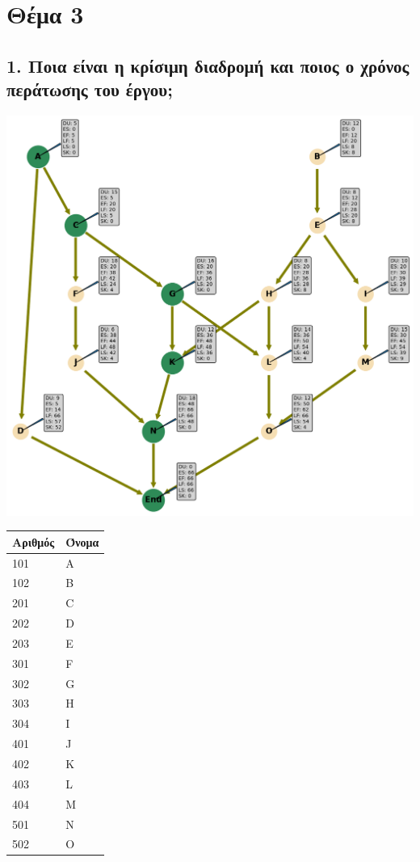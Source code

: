 \documentclass[12pt]{turabian-researchpaper}
\begin{document}
\section{Θέμα 3}
\subsection{1. Ποια είναι η κρίσιμη διαδρομή και ποιος ο χρόνος περάτωσης του έργου;}
\includegraphics[scale=0.33]{cpm_0.png}
\begin{table}[]
    \centering
    \begin{tabular}{|ll|}
        \hline
        Αριθμός & Όνομα \\ \hline
        101     & A     \\
        102     & B     \\
        201     & C     \\
        202     & D     \\
        203     & E     \\
        301     & F     \\
        302     & G     \\
        303     & H     \\
        304     & I     \\
        401     & J     \\
        402     & K     \\
        403     & L     \\
        404     & M     \\
        501     & N     \\
        502     & O     \\ \hline
    \end{tabular}
\end{table}
\end{document}
